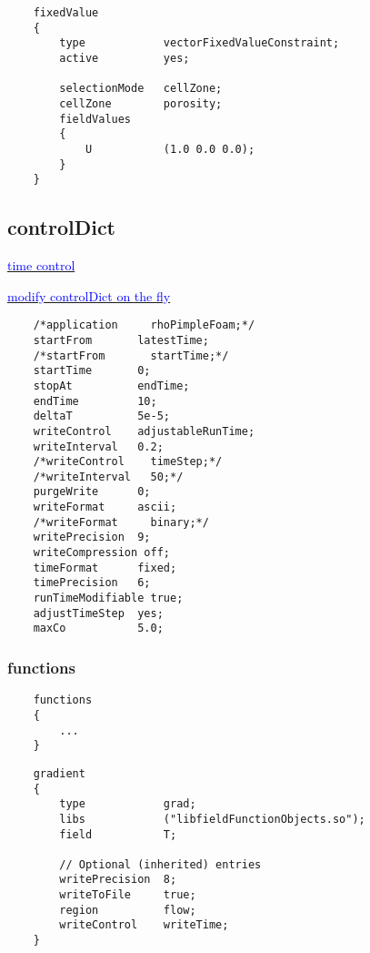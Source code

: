 \documentclass[a4paper, 12pt]{article}
\numberwithin{equation}{section}
\newcommand{\blue}[1]{\textcolor{blue}{#1}}
\begin{document}
    \begin{minipage}{\textwidth}
    \vspace{12pt}
    {
    \begin{verbatim}
    fixedValue
    {
        type            vectorFixedValueConstraint;
        active          yes;

        selectionMode   cellZone;
        cellZone        porosity;
        fieldValues
        {
            U           (1.0 0.0 0.0);
        }
    }
    \end{verbatim}
    }
    \end{minipage}

    \subsection{controlDict}

    \href{https://www.openfoam.com/documentation/user-guide/6-solving/6.1-time-and-data-inputoutput-control}{\blue{time control}}

    \href{https://www.cfd-online.com/Forums/openfoam-solving/128713-varying-time-step.html}{\blue{modify controlDict on the fly}}

    {
    \begin{verbatim}
    /*application     rhoPimpleFoam;*/
    startFrom       latestTime;
    /*startFrom       startTime;*/
    startTime       0;
    stopAt          endTime;
    endTime         10;
    deltaT          5e-5;
    writeControl    adjustableRunTime;
    writeInterval   0.2;
    /*writeControl    timeStep;*/
    /*writeInterval   50;*/
    purgeWrite      0;
    writeFormat     ascii;
    /*writeFormat     binary;*/
    writePrecision  9;
    writeCompression off;
    timeFormat      fixed;
    timePrecision   6;
    runTimeModifiable true;
    adjustTimeStep  yes;
    maxCo           5.0;
    \end{verbatim}
    }

        \subsubsection{functions}
    {
    \begin{verbatim}
    functions
    {
        ...
    }
    \end{verbatim}
    }

    \begin{minipage}{\textwidth}
    {
    \begin{verbatim}
    gradient
    {
        type            grad;
        libs            ("libfieldFunctionObjects.so");
        field           T;

        // Optional (inherited) entries
        writePrecision  8;
        writeToFile     true;
        region          flow;
        writeControl    writeTime;
    }
    \end{verbatim}
    }
    \end{minipage}
\end{document}
